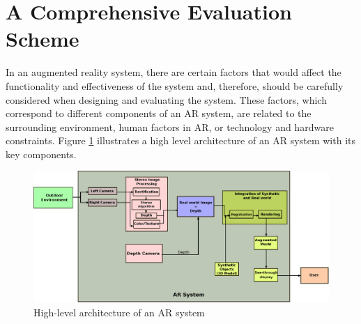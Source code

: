 
\section{A Comprehensive Evaluation Scheme}

In an augmented reality system, there are certain factors that would affect the functionality and effectiveness of the system \cite{liv05,kru10} and, therefore, 
should be carefully considered when designing and evaluating the system.
These factors, which correspond to different components of an AR system, are related to the surrounding 
environment, human factors in AR, or technology and hardware constraints.
Figure \ref{fig:AR} illustrates a high level architecture of an AR system with its key components.

\begin{figure}[H]
\centering
\includegraphics[scale=0.8]{AR}
\caption{High-level architecture of an AR system}
\label{fig:AR}
\end{figure} 

